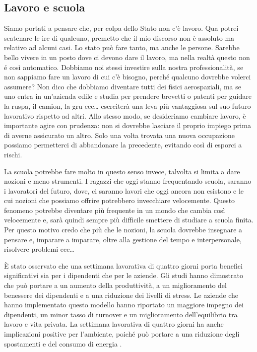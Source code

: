 \documentclass[12pt]{book} %
\begin{document}
\subsection{Lavoro e scuola}
Siamo portati a pensare che, per colpa dello Stato non
c'è lavoro. Qua potrei scatenare le ire di qualcuno, premetto che il mio discorso non è assoluto
ma relativo ad alcuni casi. Lo stato può fare tanto, ma anche le persone. Sarebbe bello vivere in un posto
dove ci devono dare il lavoro, ma nella realtà questo non é così automatico. Dobbiamo noi stessi investire sulla nostra
professionalità, se non sappiamo fare un lavoro di cui c'è bisogno, perché qualcuno dovrebbe volerci assumere? 
Non dico che dobbiamo
diventare tutti dei fisici aerospaziali, ma se uno entra in un'azienda edile e studia per prendere
brevetti o patenti per guidare la ruspa, il camion, la gru ecc… eserciterà una leva più vantaggiosa sul suo
futuro lavorativo rispetto ad altri. 
Allo stesso modo, se desideriamo cambiare lavoro, è importante agire con prudenza: non si dovrebbe lasciare il proprio impiego prima di averne assicurato un altro. Solo una volta trovata una nuova occupazione possiamo permetterci di abbandonare la precedente, evitando così di esporci a rischi.

La scuola potrebbe fare molto in questo senso invece, talvolta si limita a dare nozioni e meno strumenti. I ragazzi che oggi stanno frequentando scuola, saranno
i lavoratori del futuro, dove, ci saranno lavori che oggi ancora non esistono e le cui nozioni che possiamo offrire potrebbero invecchiare velocemente. Questo fenomeno potrebbe diventare più frequente in un mondo che cambia così velocemente e, sarà quindi sempre più difficile smettere di studiare a scuola finita. Per questo motivo credo che più che le nozioni, la scuola dovrebbe insegnare a pensare e, imparare a imparare, oltre alla gestione del tempo e interpersonale, risolvere problemi ecc… 

\begin{mdframed}[linewidth=1pt]
È stato osservato che una settimana lavorativa di quattro giorni porta benefici significativi sia per i dipendenti che per le aziende. Gli studi hanno dimostrato che può portare a un aumento della produttività, a un miglioramento del benessere dei dipendenti e a una riduzione dei livelli di stress. Le aziende che hanno implementato questo modello hanno riportato un maggiore impegno dei dipendenti, un minor tasso di turnover e un miglioramento dell'equilibrio tra lavoro e vita privata. La settimana lavorativa di quattro giorni ha anche implicazioni positive per l'ambiente, poiché può portare a una riduzione degli spostamenti e del consumo di energia .
\end{mdframed}
\end{document}
